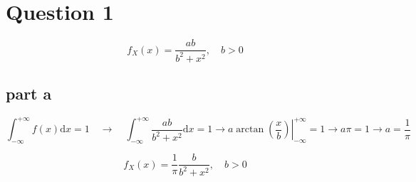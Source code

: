 \section{Question 1}
$$
f_X(x) = \dfrac{ab}{b^2+x^2}, \quad b > 0
$$
\subsection{part a}

$$
\int_{-\infty}^{+\infty} f(x) \text{d}x = 1 \quad \rightarrow \quad \int_{-\infty}^{+\infty} \dfrac{ab}{b^2+x^2} \text{d}x = 1 \rightarrow \left. a\arctan (\dfrac{x}{b}) 
\right|_{-\infty}^{+\infty} = 1 \rightarrow a\pi = 1 \to a = \dfrac{1}{\pi}
$$

$$
f_X(x) = \dfrac{1}{\pi} \dfrac{b}{b^2+x^2}, \quad b > 0
$$
